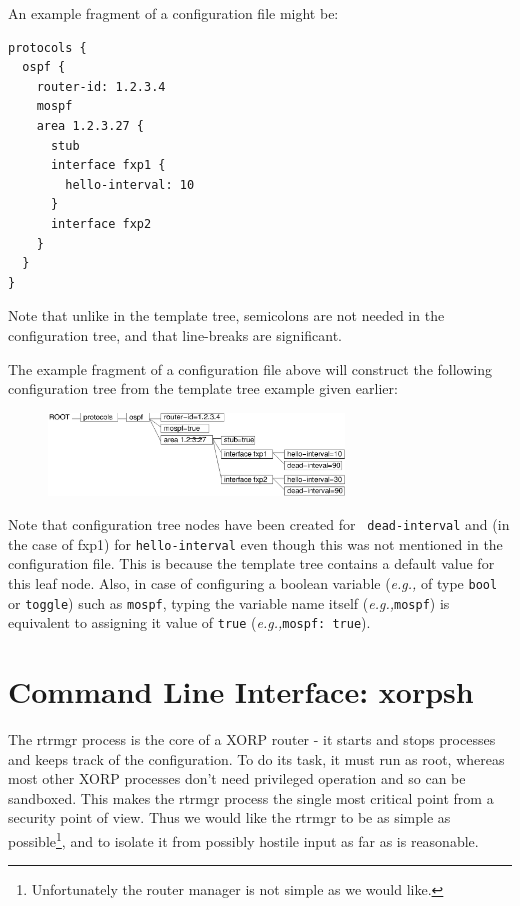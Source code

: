 \documentclass[11pt]{article}
\newcommand{\eg}{\emph{e.g.,}\xspace}
\begin{document}
An example fragment of a configuration file might be:

\begin{verbatim}
protocols {
  ospf {
    router-id: 1.2.3.4
    mospf
    area 1.2.3.27 {
      stub
      interface fxp1 {
        hello-interval: 10
      }
      interface fxp2
    }
  }
}
\end{verbatim}

Note that unlike in the template tree, semicolons are not needed in the
configuration tree, and that line-breaks are significant.

The example fragment of a configuration file above will construct the
following configuration tree from the template tree example given
earlier:

\begin{figure}[htb]
\centerline{\includegraphics[width=0.7\textwidth]{figs/config}}
\vspace{.05in}
\end{figure}

Note that configuration tree nodes have been created for {\tt
dead-interval} and (in the case of fxp1) for {\tt hello-interval} even
though this was not mentioned in the configuration file.  This is
because the template tree contains a default value for this leaf node.
Also, in case of configuring a boolean variable (\eg of type {\tt bool} or
{\tt toggle}) such as {\tt mospf}, typing the variable name itself
(\eg \verb=mospf=) is equivalent to assigning it value of {\tt true}
(\eg \verb=mospf: true=).

\newpage

\section{Command Line Interface: xorpsh}

The rtrmgr process is the core of a XORP router - it starts and stops
processes and keeps track of the configuration.  To do its task, it
must run as root, whereas most other XORP processes don't need
privileged operation and so can be sandboxed.  This makes the rtrmgr
process the single most critical point from a security point of view.
Thus we would like the rtrmgr to be as simple as
possible\footnote{Unfortunately the router manager is not simple as we
would like.}, and to isolate it from possibly hostile input as far as
is reasonable.
\end{document}
